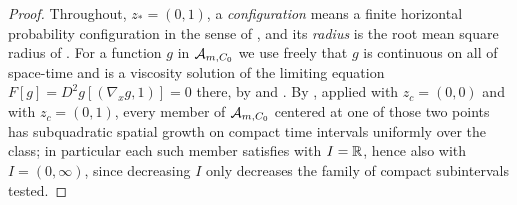 \begin{proof}
Throughout, $z_*=(0,1)$, a \emph{configuration} means a finite horizontal
probability configuration in the sense of , and its
\emph{radius} is the root mean square radius of . For a
function $g$ in $\mathcal{A}_{m,C_0}$ we use freely that $g$ is continuous on all of
space-time and is a viscosity solution of the limiting equation
$F[g]=D^2g[(\nabla_xg,1)]=0$ there, by  and
. By , applied with
$z_c=(0,0)$ and with $z_c=(0,1)$, every member of $\mathcal{A}_{m,C_0}$ centered at
one of those two points has subquadratic spatial growth on compact time
intervals uniformly over the class; in particular each such member satisfies
 with $I=\mathbb{R}$, hence also with $I=(0,\infty)$, since
decreasing $I$ only decreases the family of compact subintervals tested.


\end{proof}
